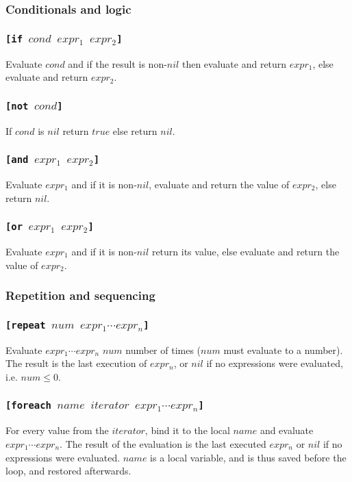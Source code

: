 \documentclass[11pt]{report}
\begin{document}
\subsubsection{Conditionals and logic}
\subsubsection*{\tt{[if }$cond$ $expr_1$ $expr_2$\tt{]}}
Evaluate $cond$ and if the result is non-$nil$ then evaluate and return $expr_1$, else evaluate and return $expr_2$.

\subsubsection*{\tt{[not }$cond$\tt{]}}
If $cond$ is $nil$ return $true$ else return $nil$.

\subsubsection*{\tt{[and }$expr_1$ $expr_2$\tt{]}}
Evaluate $expr_1$ and if it is non-$nil$, evaluate and return the value of $expr_2$, else return $nil$.

\subsubsection*{\tt{[or }$expr_1$ $expr_2$\tt{]}}
Evaluate $expr_1$ and if it is non-$nil$ return its value, else evaluate and return the value of $expr_2$.

\subsubsection{Repetition and sequencing}
\subsubsection*{\tt{[repeat }$num$ $expr_1 \cdots expr_n$\tt{]}}
Evaluate $expr_1 \cdots expr_n$ $num$ number of times ($num$ must evaluate to a number). The result is the last execution of $expr_n$, or $nil$ if no expressions were evaluated, i.e. $num \leq 0$.

\subsubsection*{\tt{[foreach }$name$ $iterator$ $expr_1 \cdots expr_n$\tt{]}}
For every value from the $iterator$, bind it to the local $name$ and evaluate $expr_1 \cdots expr_n$. The result of the evaluation is the last executed $expr_n$ or $nil$ if no expressions were evaluated. $name$ is a local variable, and is thus saved before the loop, and restored afterwards.
\end{document}
